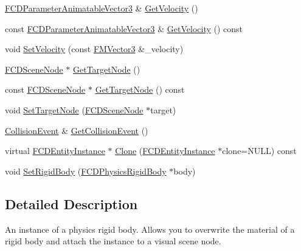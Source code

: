 \begin{DoxyCompactItemize}
\item 
\hyperlink{classFCDParameterAnimatableT}{FCDParameterAnimatableVector3} \& \hyperlink{classFCDPhysicsRigidBodyInstance_adeb5b351b6a3250478cdbd5d9753cb7f}{GetVelocity} ()
\item 
const \hyperlink{classFCDParameterAnimatableT}{FCDParameterAnimatableVector3} \& \hyperlink{classFCDPhysicsRigidBodyInstance_a53f3bcaba7356fc1fcfb8966073370f5}{GetVelocity} () const 
\item 
void \hyperlink{classFCDPhysicsRigidBodyInstance_a61629cabc236654b01fb943da2c8c444}{SetVelocity} (const \hyperlink{classFMVector3}{FMVector3} \&\_\-velocity)
\item 
\hyperlink{classFCDSceneNode}{FCDSceneNode} $\ast$ \hyperlink{classFCDPhysicsRigidBodyInstance_aa1218819a69cb9d530f9ef7f12ea7c5f}{GetTargetNode} ()
\item 
const \hyperlink{classFCDSceneNode}{FCDSceneNode} $\ast$ \hyperlink{classFCDPhysicsRigidBodyInstance_a31b61526f84348c40d736c9ee3016fd3}{GetTargetNode} () const 
\item 
void \hyperlink{classFCDPhysicsRigidBodyInstance_a07abc1680ca9d963c5bab07741cd8227}{SetTargetNode} (\hyperlink{classFCDSceneNode}{FCDSceneNode} $\ast$target)
\item 
\hyperlink{classFUEvent2}{CollisionEvent} \& \hyperlink{classFCDPhysicsRigidBodyInstance_adb6369eabe78bbb2601fbc3461b969ba}{GetCollisionEvent} ()
\item 
virtual \hyperlink{classFCDEntityInstance}{FCDEntityInstance} $\ast$ \hyperlink{classFCDPhysicsRigidBodyInstance_a7c3afe016b0f2c00a21a8b586bc32ce9}{Clone} (\hyperlink{classFCDEntityInstance}{FCDEntityInstance} $\ast$clone=NULL) const 
\item 
void \hyperlink{classFCDPhysicsRigidBodyInstance_a24ccda9bd7b0c5554a06e47ca3a5c51c}{SetRigidBody} (\hyperlink{classFCDPhysicsRigidBody}{FCDPhysicsRigidBody} $\ast$body)
\end{DoxyCompactItemize}


\subsection{Detailed Description}
An instance of a physics rigid body. Allows you to overwrite the material of a rigid body and attach the instance to a visual scene node. 

